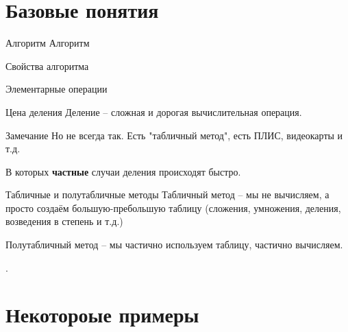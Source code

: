 \section{Базовые понятия}\label{section:base_alg}

\begin{frame}{Алгоритм}
Алгоритм

Свойства алгоритма	
\end{frame}

\begin{frame}{Элементарные операции}
	
\end{frame}

\begin{frame}{Цена деления}
Деление -- сложная и дорогая вычислительная операция.

\begin{block}{Замечание}
Но не всегда так. 
Есть "табличный метод",
есть ПЛИС, видеокарты и т.д.

В которых \textbf{частные} случаи деления происходят быстро.
\end{block}

\end{frame}

\begin{frame}{Табличные и полутабличные методы}
	Табличный метод -- мы не вычисляем, а просто создаём большую-пребольшую таблицу (сложения, умножения, деления, возведения в степень и т.д.)
	
	
	Полутабличный метод -- мы частично используем таблицу, частично вычисляем.
	
	.
\end{frame}



\section{Некотороые примеры}\label{section:examples_1}

